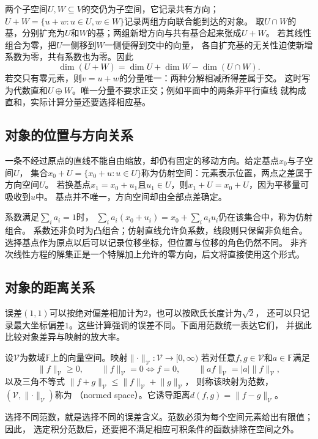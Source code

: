 两个子空间$U,W\subseteq V$的交仍为子空间，它记录共有方向；
$U+W=\{u+w:u\in U,w\in W\}$记录两组方向联合能到达的对象。
取$U\cap W$的基，分别扩充为$U$和$W$的基；两组新增方向与共有基合起来张成$U+W$。
若其线性组合为零，把$U$一侧移到$W$一侧便得到交中的向量，
各自扩充基的无关性迫使新增系数为零，共有系数也为零。因此
\[
 \dim(U+W)=\dim U+\dim W-\dim(U\cap W).
\]
若交只有零元素，则$v=u+w$的分量唯一：两种分解相减所得差属于交。
这时写为代数直和$U\oplus W$。唯一分量不要求正交；例如平面中的两条非平行直线
就构成直和，实际计算分量还要选择相应基。

\subsection{对象的位置与方向关系}
\label{sec:linear-algebra-affine-relations}

一条不经过原点的直线不能自由缩放，却仍有固定的移动方向。给定基点$x_0$与子空间$U$，
集合$x_0+U=\{x_0+u:u\in U\}$称为仿射空间：元素表示位置，两点之差属于方向空间$U$。
若换基点$x_1=x_0+u_1$且$u_1\in U$，则$x_1+U=x_0+U$，因为平移量可吸收到$u$中。
基点并不唯一，方向空间却由全部点差确定。

系数满足$\sum_i a_i=1$时，
$\sum_i a_i(x_0+u_i)=x_0+\sum_i a_i u_i$仍在该集合中，称为仿射组合。
系数还非负时为凸组合；仿射直线允许负系数，线段则只保留非负组合。
选择基点作为原点以后可以记录位移坐标，但位置与位移的角色仍然不同。
非齐次线性方程的解集正是一个特解加上允许的零方向，后文将直接使用这个形式。

\subsection{对象的距离关系}
\label{sec:linear-algebra-distance-relations}
\label{sec:ch06-map-comparison}
\label{sec:matrix-analysis-norms-effective-rank}

误差$(1,1)$可以按绝对偏差相加计为$2$，也可以按欧氏长度计为$\sqrt2$，
还可以只记录最大坐标偏差$1$。这些计算强调的误差不同。下面用范数统一表达它们，
并据此比较对象差异与映射的放大率。
\begin{definition}[赋范空间]
\label{def:functional-normed-space}
设$\mathcal V$为数域$\mathbb F$上的向量空间。映射$\lVert\cdot\rVert_{\mathcal V}:\mathcal V\to[0,\infty)$
若对任意$f,g\in\mathcal V$和$a\in\mathbb F$满足
\[
  \lVert f\rVert_{\mathcal{V}}\geq0,\qquad
  \lVert f\rVert_{\mathcal{V}}=0\Longleftrightarrow f=0,\qquad
  \lVert af\rVert_{\mathcal{V}}=|a|\lVert f\rVert_{\mathcal{V}},
\]
以及三角不等式
$\lVert f+g\rVert_{\mathcal{V}}\leq
\lVert f\rVert_{\mathcal{V}}+\lVert g\rVert_{\mathcal{V}}$，
则称该映射为范数，$(\mathcal V,\lVert\cdot\rVert_{\mathcal V})$称为
（normed space）。它诱导距离$d(f,g)=\lVert f-g\rVert_{\mathcal V}$。
\end{definition}
选择不同范数，就是选择不同的误差含义。范数必须为每个空间元素给出有限值；因此，
选定积分范数后，还要把不满足相应可积条件的函数排除在空间之外。


